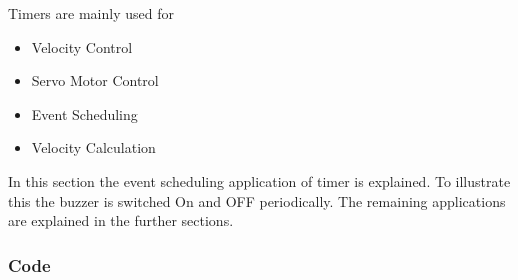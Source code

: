 \documentclass[a4paper,10pt,oneside]{article}
\begin{document}
			Timers are mainly used for
			\begin{itemize}
				\item Velocity Control
				\item Servo Motor Control
				\item Event Scheduling
				\item Velocity Calculation
			\end{itemize}
			
			In this section the event scheduling application of timer is explained. To illustrate this the buzzer is switched On and OFF periodically. The remaining applications are explained in the further sections. \\
			\subsubsection{\textbf{Code}}
\end{document}
